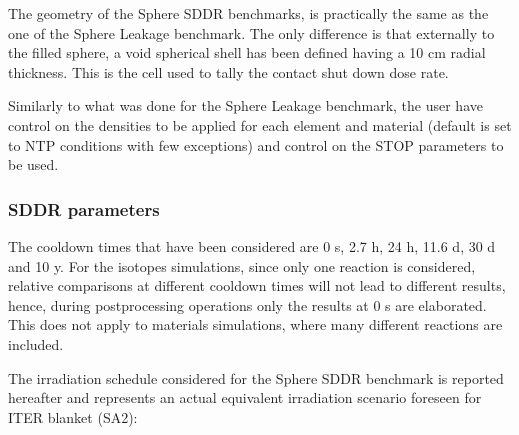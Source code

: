 \documentclass[letterpaper,10pt,english]{sphinxmanual}
\begin{document}
\sphinxAtStartPar
The geometry of the Sphere SDDR benchmarks, is practically the same as the one
of the Sphere Leakage benchmark. The only difference is that externally to the filled
sphere, a void spherical shell has been defined having a 10 cm radial thickness.
This is the cell used to tally the contact shut down dose rate.

\sphinxAtStartPar
Similarly to what was done for the Sphere Leakage benchmark, the user have control on
the densities to be applied for each element and material (default is set to NTP
conditions with few exceptions) and control on the STOP parameters to be used.


\subsubsection{SDDR parameters}
\label{\detokenize{usage/benchmarks:sddr-parameters}}
\sphinxAtStartPar
The cool\sphinxhyphen{}down times that have been considered are 0 s, 2.7 h, 24 h, 11.6 d, 30 d
and 10 y. For the isotopes simulations, since only one reaction is considered, relative
comparisons at different cool\sphinxhyphen{}down times will not lead to different results, hence,
during post\sphinxhyphen{}processing operations only the results at 0 s are elaborated. This does
not apply to materials simulations, where many different reactions are included.

\sphinxAtStartPar
The irradiation schedule considered for the Sphere SDDR benchmark is reported hereafter
and represents an actual equivalent irradiation scenario foreseen for ITER blanket (SA2):
\end{document}
